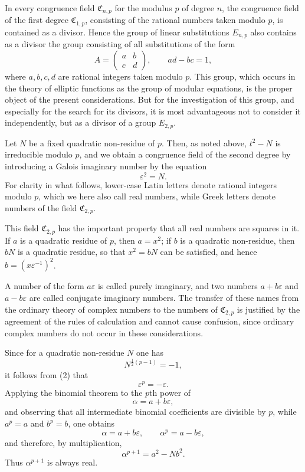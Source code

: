 \documentclass[11pt]{article}
\providecommand{\mat}[4]{\begin{pmatrix}#1&#2\\#3&#4\end{pmatrix}}
\providecommand{\mat}[4]{\begin{pmatrix}#1&#2\\#3&#4\end{pmatrix}}
\providecommand{\Cfield}{\mathfrak C}
\begin{document}
In every congruence field $\Cfield_{n,p}$ for the modulus $p$ of degree $n$, the congruence field of the first degree $\Cfield_{1,p}$, consisting of the rational numbers taken modulo $p$, is contained as a divisor. Hence the group of linear substitutions $E_{n,p}$ also contains as a divisor the group consisting of all substitutions of the form
\begin{equation}
 A=\mat{a}{b}{c}{d},\qquad ad-bc=1,
 \tag{1}
\end{equation}
where $a,b,c,d$ are rational integers taken modulo $p$. This group, which occurs in the theory of elliptic functions as the group of modular equations, is the proper object of the present considerations. But for the investigation of this group, and especially for the search for its divisors, it is most advantageous not to consider it independently, but as a divisor of a group $E_{2,p}$.

Let $N$ be a fixed quadratic non-residue of $p$. Then, as noted above, $t^2-N$ is irreducible modulo $p$, and we obtain a congruence field of the second degree by introducing a Galois imaginary number by the equation
\begin{equation}
 \varepsilon^2=N.
 \tag{2}
\end{equation}
For clarity in what follows, lower-case Latin letters denote rational integers modulo $p$, which we here also call real numbers, while Greek letters denote numbers of the field $\Cfield_{2,p}$.

This field $\Cfield_{2,p}$ has the important property that all real numbers are squares in it. If $a$ is a quadratic residue of $p$, then $a=x^2$; if $b$ is a quadratic non-residue, then $bN$ is a quadratic residue, so that $x^2=bN$ can be satisfied, and hence $b=(x\varepsilon^{-1})^2$.

A number of the form $a\varepsilon$ is called purely imaginary, and two numbers $a+b\varepsilon$ and $a-b\varepsilon$ are called conjugate imaginary numbers. The transfer of these names from the ordinary theory of complex numbers to the numbers of $\Cfield_{2,p}$ is justified by the agreement of the rules of calculation and cannot cause confusion, since ordinary complex numbers do not occur in these considerations.

Since for a quadratic non-residue $N$ one has
\[
 N^{\frac12(p-1)}=-1,
\]
it follows from (2) that
\begin{equation}
 \varepsilon^p=-\varepsilon .
 \tag{3}
\end{equation}
Applying the binomial theorem to the $p$th power of
\[
 \alpha=a+b\varepsilon,
\]
and observing that all intermediate binomial coefficients are divisible by $p$, while $a^p=a$ and $b^p=b$, one obtains
\begin{equation}
 \alpha=a+b\varepsilon,
 \qquad \alpha^p=a-b\varepsilon,
 \tag{4}
\end{equation}
and therefore, by multiplication,
\begin{equation}
 \alpha^{p+1}=a^2-Nb^2.
 \tag{5}
\end{equation}
Thus $\alpha^{p+1}$ is always real.
\end{document}
